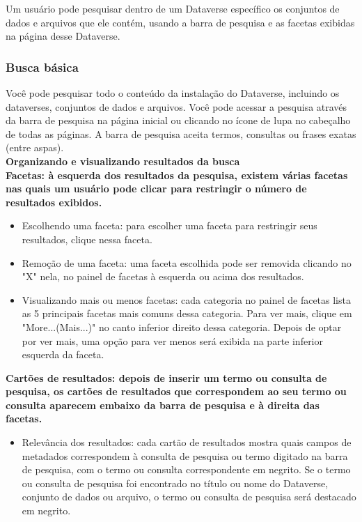 \documentclass[12pt,hidelinks]{article}
\begin{document}
Um usuário pode pesquisar dentro de um Dataverse específico os conjuntos de dados e arquivos que ele contém, usando a barra de pesquisa e as facetas exibidas na página desse Dataverse.
	
	    \subsubsection{Busca básica}
	    
\qquad Você pode pesquisar todo o conteúdo da instalação do Dataverse, incluindo os dataverses, conjuntos de dados e arquivos. Você pode acessar a pesquisa através da barra de pesquisa na página inicial ou clicando no ícone de lupa no cabeçalho de todas as páginas. A barra de pesquisa aceita termos, consultas ou frases exatas (entre aspas).\\
	    
	    
 \textbf{Organizando e visualizando resultados da busca}\\
	        
	        
\textbf {Facetas: à esquerda dos resultados da pesquisa, existem várias facetas nas quais um usuário pode clicar para restringir o número de resultados exibidos.}

\begin{itemize}
\item Escolhendo uma faceta: para escolher uma faceta para restringir seus resultados, clique nessa faceta.
\item Remoção de uma faceta: uma faceta escolhida pode ser removida clicando no "X" nela, no painel de facetas à esquerda ou acima dos resultados.
\item Visualizando mais ou menos facetas: cada categoria no painel de facetas lista as 5 principais facetas mais comuns dessa categoria. Para ver mais, clique em "More...(Mais...)" no canto inferior direito dessa categoria. Depois de optar por ver mais, uma opção para ver menos será exibida na parte inferior esquerda da faceta.
\end{itemize}

\textbf{Cartões de resultados: depois de inserir um termo ou consulta de pesquisa, os cartões de resultados que correspondem ao seu termo ou consulta aparecem embaixo da barra de pesquisa e à direita das facetas.}

\begin{itemize}
\item Relevância dos resultados: cada cartão de resultados mostra quais campos de metadados correspondem à consulta de pesquisa ou termo digitado na barra de pesquisa, com o termo ou consulta correspondente em negrito. Se o termo ou consulta de pesquisa foi encontrado no título ou nome do Dataverse, conjunto de dados ou arquivo, o termo ou consulta de pesquisa será destacado em negrito.
\end{itemize}
\end{document}
